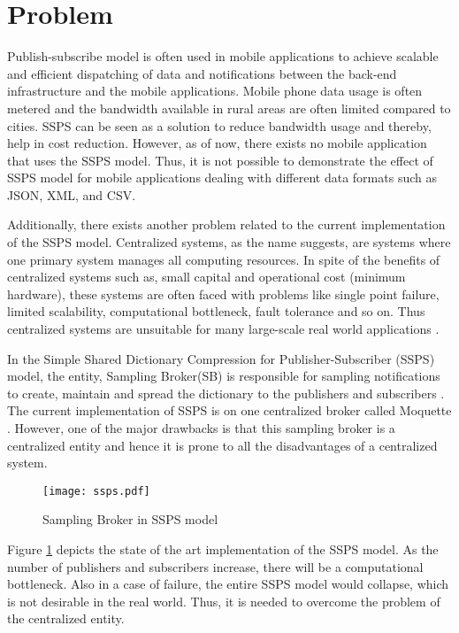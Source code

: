 \section{Problem}

Publish-subscribe model is often used in mobile applications to achieve scalable and efficient dispatching of data and notifications between the back-end infrastructure and the mobile applications. Mobile phone data usage is often metered and the bandwidth available in rural areas are often limited compared to cities. SSPS can be seen as a solution to reduce bandwidth usage and thereby, help in cost reduction. However, as of now, there exists no mobile application that uses the SSPS model. Thus, it is not possible to demonstrate the effect of SSPS model for mobile applications dealing with different data formats such as JSON, XML, and CSV.

Additionally, there exists another problem related to the current implementation of the SSPS model. Centralized systems, as the name suggests, are systems where one primary system manages all computing resources. In spite of the benefits of centralized systems such as, small capital and operational cost (minimum hardware), these systems are often faced with problems like single point failure, limited scalability, computational bottleneck, fault tolerance and so on. Thus centralized systems are unsuitable for many large-scale real world applications \parencite{tanenbaum2007distributed}.

In the Simple Shared Dictionary Compression for Publisher-Subscriber (SSPS) model, the entity, Sampling Broker(SB) is responsible for sampling notifications to create, maintain and spread the dictionary to the publishers and subscribers \parencite{Doblander:2016:SDC}. The current implementation of SSPS is on one centralized broker called Moquette \parencite{moquette}. However, one of the major drawbacks is that this sampling broker is a centralized entity and hence it is prone to all the disadvantages of a centralized system.

\makeatletter
\setlength{\@fptop}{0pt}
\makeatother

\begin{figure}[t!]
\centering
\texttt{[image: ssps.pdf]}
\caption{Sampling Broker in SSPS model}\label{figures:ssps}
\end{figure}

Figure \ref{figures:ssps} depicts the state of the art implementation of the SSPS model. As the number of publishers and subscribers increase, there will be a computational bottleneck. Also in a case of failure, the entire SSPS model would collapse, which is not desirable in the real world. Thus, it is needed to overcome the problem of the centralized entity.